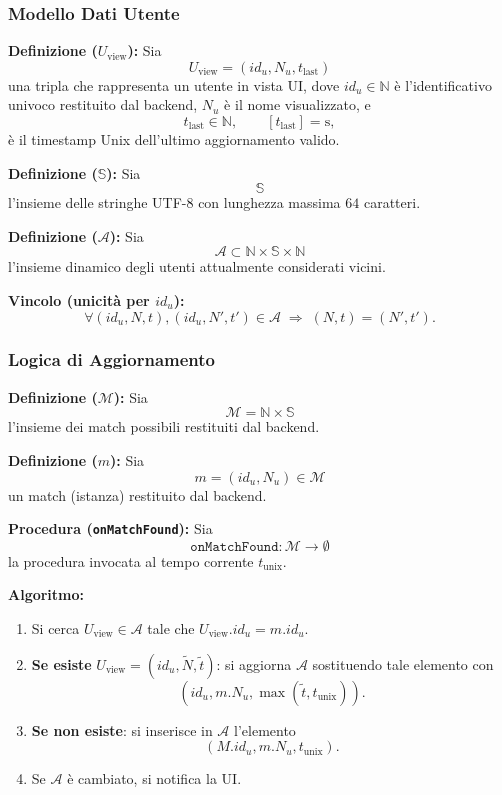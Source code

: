 \documentclass[a4paper,11pt,table,dvipsnames]{article}
\begin{document}
\subsubsection{Modello Dati Utente}

\textbf{Definizione (\(U_{\text{view}}\)):}
Sia
\[
    U_{\text{view}} = (id_u, N_u, t_{\text{last}})
\]
una tripla che rappresenta un utente in vista UI, dove \(id_u \in \mathbb{N}\) è l’identificativo univoco restituito dal backend,
\(N_u\) è il nome visualizzato, e
\[
    t_{\text{last}} \in \mathbb{N}, \qquad [t_{\text{last}}]=\si{\second},
\]
è il timestamp Unix dell’ultimo aggiornamento valido.

\textbf{Definizione (\(\mathbb{S}\)):}
Sia \[\mathbb{S}\] l’insieme delle stringhe UTF-8 con lunghezza massima \(64\) caratteri.

\textbf{Definizione (\(\mathcal{A}\)):}
Sia
\[
    \mathcal{A} \subset \mathbb{N} \times \mathbb{S} \times \mathbb{N}
\]
l’insieme dinamico degli utenti attualmente considerati vicini.


\textbf{Vincolo (unicità per \(id_u\)):}
\[
    \forall (id_u,N,t),(id_u,N',t') \in \mathcal{A} \;\Rightarrow\; (N,t)=(N',t').
\]

\subsubsection{Logica di Aggiornamento}

\textbf{Definizione (\(\mathcal{M}\)):}
Sia
\[
    \mathcal{M} = \mathbb{N} \times \mathbb{S}
\]
l’insieme dei match possibili restituiti dal backend.

\textbf{Definizione (\(m\)):}
Sia
\[
    m=(id_u, N_u)\in\mathcal{M}
\]
un match (istanza) restituito dal backend.

\textbf{Procedura (\texttt{onMatchFound}):}
Sia
\[
    \texttt{onMatchFound}: \mathcal{M} \rightarrow \emptyset
\]
la procedura invocata al tempo corrente \(t_{\text{unix}}\).

\textbf{Algoritmo:}
\begin{enumerate}
    \item Si cerca \(U_{\text{view}} \in \mathcal{A}\) tale che \(U_{\text{view}}.id_u = m.id_u\).

    \item \textbf{Se esiste} \(U_{\text{view}}=(id_u,\widetilde{N},\widetilde{t})\):
          si aggiorna \(\mathcal{A}\) sostituendo tale elemento con
          \[
              (id_u, m.N_u, \max(\widetilde{t}, t_{\text{unix}})).
          \]

    \item \textbf{Se non esiste}:
          si inserisce in \(\mathcal{A}\) l’elemento
          \[
              (M.id_u, m.N_u, t_{\text{unix}}).
          \]

    \item Se \(\mathcal{A}\) è cambiato, si notifica la UI.
\end{enumerate}
\end{document}
